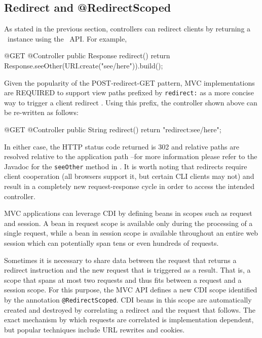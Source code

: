 \subsection{Redirect and @RedirectScoped}
\label{redirect}
 
As stated in the previous section, controllers can redirect clients by returning a \Response\
instance using the \jaxrs\ API. For example,

\begin{listing}{1}
@GET
@Controller
public Response redirect() {
    return Response.seeOther(URI.create("see/here")).build();
}
\end{listing}

Given the popularity of the POST-redirect-GET pattern, MVC implementations are REQUIRED to
support view paths prefixed by {\tt redirect:} as a more concise way to trigger a client redirect . Using this prefix, the controller shown above can be re-written as follows:

\begin{listing}{1}
@GET
@Controller
public String redirect() {
	return "redirect:see/here";
}
\end{listing}

In either case, the HTTP status code returned is 302 and relative paths are resolved 
relative to the application path --for more information please refer to the Javadoc for
the {\tt seeOther} method in \jaxrs. It is worth noting that redirects require client 
cooperation (all browsers support it, but
certain CLI clients may not) and result in a completely new 
request-response cycle in order to access the intended controller.

MVC applications can leverage CDI by defining beans in scopes such as request
and session. A bean in request scope is available only during the processing of a single 
request, while a bean in session scope is available throughout an entire web session 
which can potentially span tens or even hundreds of requests. 

Sometimes it is necessary
to share data between the request that returns a redirect instruction and the new request
that is triggered as a result. That is, a scope that spans at most two requests and thus fits
between a request and a session scope. For this purpose, the MVC API defines a new
CDI scope identified by the annotation {\tt @RedirectScoped}. CDI beans in this scope
are automatically created and destroyed by correlating a redirect and the request that
follows. The exact mechanism by which requests are correlated is implementation 
dependent, but popular techniques include URL rewrites and cookies.

